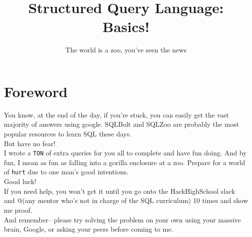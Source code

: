 \documentclass{42-en}
\begin{document}
                           \title{Structured Query Language: Basics!}
                          \subtitle{The world is a zoo, you've seen the news}


\maketitle

\tableofcontents


\chapter{Foreword}

	You know, at the end of the day, if you're stuck, you can easily get the 
	vast majority of answers using google. SQLBolt and SQLZoo are probably 
	the most popular resources to learn SQL these days. \\
	
	But have no fear! \\ 

	I wrote a \texttt{TON} of extra queries for you all to complete and have fun 
	doing. And by fun, I mean as fun as falling into a gorilla enclosure at a 
	zoo. Prepare for a world of \texttt{hurt} due to one man's good intentions. \\

	Good luck! \\

	If you need help, you won't get it until you go onto the HackHighSchool slack 
	and @(any mentor who's not in charge of the SQL curriculum) 10 times and show me proof. \\

	And remember-- please try solving the problem on your own using your massive brain, 
	Google, or asking your peers before coming to me. \\ 
\end{document}
